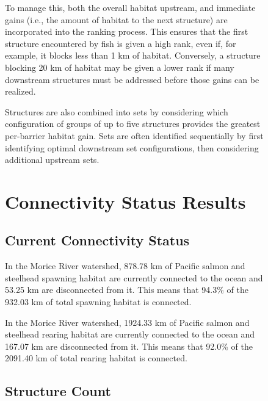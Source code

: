 \documentclass[
  letterpaper,
  DIV=11,
  numbers=noendperiod]{scrreprt}
\begin{document}
\begin{figure}
{To manage this, both the overall habitat upstream, and immediate gains
(i.e., the amount of habitat to the next structure) are incorporated
into the ranking process. This ensures that the first structure
encountered by fish is given a high rank, even if, for example, it
blocks less than 1 km of habitat. Conversely, a structure blocking 20 km
of habitat may be given a lower rank if many downstream structures must
be addressed before those gains can be realized.

Structures are also combined into sets by considering which
configuration of groups of up to five structures provides the greatest
per-barrier habitat gain. Sets are often identified sequentially by
first identifying optimal downstream set configurations, then
considering additional upstream sets.


\chapter*{Connectivity Status
Results}\label{connectivity-status-results}


\section*{Current Connectivity
Status}\label{current-connectivity-status-1}


In the Morice River watershed, 878.78 km of Pacific salmon and steelhead
spawning habitat are currently connected to the ocean and 53.25 km are
disconnected from it. This means that 94.3\% of the 932.03 km of total
spawning habitat is connected.

In the Morice River watershed, 1924.33 km of Pacific salmon and
steelhead rearing habitat are currently connected to the ocean and
167.07 km are disconnected from it. This means that 92.0\% of the
2091.40 km of total rearing habitat is connected.

\section*{Structure Count}\label{structure-count}

}
\end{figure}
\end{document}
